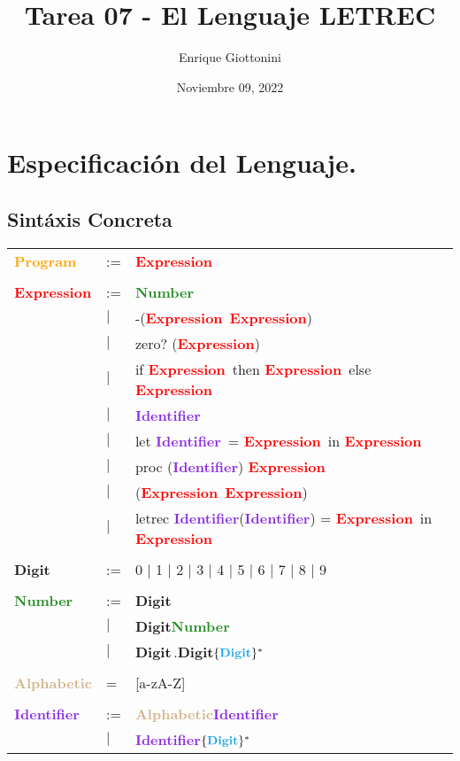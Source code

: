 \documentclass[11pt]{article}
\title{ Tarea 07 - El Lenguaje LETREC}
\author{ Enrique Giottonini }
\date{Noviembre 09, 2022}
\newcommand\Program{\textcolor{Orange}{\textbf{Program}}}
\newcommand\Expression{\textcolor{Red}{\textbf{Expression}}}
\newcommand\Number{\textcolor{ForestGreen}{\textbf{Number}}}
\newcommand\Identifier{\textcolor{BlueViolet}{\textbf{Identifier}}}
\newcommand\Digit{\textcolor{Cerulean}{\textbf{Digit}}}
\newcommand\Alphab{\textcolor{Tan}{\textbf{Alphabetic}}}
\begin{document}
\maketitle	

\section*{Especificación del Lenguaje.}
\subsection*{Sintáxis Concreta}
\begin{table}[h]
\begin{tabular}{lll}
\Program    & :=  & \Expression \\ \\
\Expression & :=  & \Number                                                           	\\
            & $|$ & -(\Expression \, \Expression)                                   		\\
            & $|$ & zero? (\Expression)                                          	 	\\
            & $|$ & if \Expression \, then \Expression \, else \Expression        		\\
            & $|$ & \Identifier                                                  		\\
            & $|$ & let \Identifier \, = \Expression \,  in \Expression           		\\
            & $|$ & proc (\Identifier) \Expression                                		\\
            & $|$ & (\Expression \, \Expression)                                  		\\
            & $|$ & letrec \Identifier(\Identifier) = \Expression \, in \Expression  \\ \\
\Digit      & :=  & 0 $|$  1 $|$ 2 $|$ 3 $|$ 4 $|$ 5 $|$ 6 $|$ 7 $|$ 8 $|$ 9      	\\ \\
\Number     & :=  & \Digit                       		\\
            & $|$ & \Digit \Number         				\\
            & $|$ & \Digit \,.\Digit$\{\Digit\}^*$   \\ \\
\Alphab     &  =  & [a-zA-Z]                         \\ \\
\Identifier & :=  & \Alphab\Identifier                  \\
            & $|$ & \Identifier$\{\Digit\}^*$           \\
                                                       
\end{tabular}
\end{table}
\newpage
\end{document}
